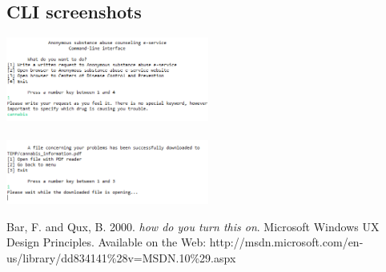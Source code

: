 \documentclass[a4paper,12pt, twocolumn]{article}
\begin{document}
\subsection{CLI screenshots}

\begin{center}
\includegraphics[width=0.5\textwidth]{images/cli_screen_1.png}
\label{cli_1}
~\\~\\

\includegraphics[width=0.5\textwidth]{images/cli_screen_2.png}
\label{cli_1}
\end{center}




\begin{thebibliography}{9}

  Bar, F. and Qux, B. 2000. \emph{how do you turn this on}.	%
 Microsoft Windows UX Design Principles. Available on the Web: http://msdn.microsoft.com/en-us/library/dd834141\%28v=MSDN.10\%29.aspx

\end{thebibliography}
\end{document}
